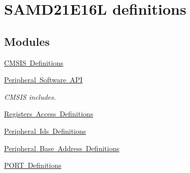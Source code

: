 \hypertarget{group___s_a_m_d21_e16_l__definitions}{}\section{S\+A\+M\+D21\+E16L definitions}
\label{group___s_a_m_d21_e16_l__definitions}
\subsection*{Modules}
\begin{DoxyCompactItemize}
\item 
\mbox{\hyperlink{group___s_a_m_d21_e16_l__cmsis}{C\+M\+S\+I\+S Definitions}}
\item 
\mbox{\hyperlink{group___s_a_m_d21_e16_l__api}{Peripheral Software A\+PI}}
\begin{DoxyCompactList}\small\item\em C\+M\+S\+IS includes. \end{DoxyCompactList}\item 
\mbox{\hyperlink{group___s_a_m_d21_e16_l__reg}{Registers Access Definitions}}
\item 
\mbox{\hyperlink{group___s_a_m_d21_e16_l__id}{Peripheral Ids Definitions}}
\item 
\mbox{\hyperlink{group___s_a_m_d21_e16_l__base}{Peripheral Base Address Definitions}}
\item 
\mbox{\hyperlink{group___s_a_m_d21_e16_l__port}{P\+O\+R\+T Definitions}}
\end{DoxyCompactItemize}
